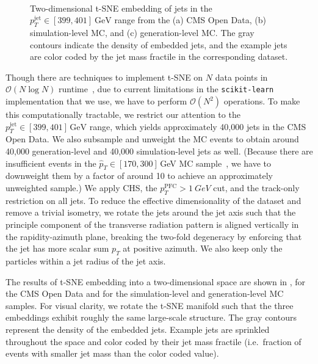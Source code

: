 \documentclass[aps,prd,twocolumn,preprintnumbers,nofootinbib,longbibliography,floatfix,superscriptaddress]{revtex4-1}
\begin{document}
\begin{figure*}
  \\
  \caption{
  Two-dimensional t-SNE embedding of jets in the $p_T^\text{jet}\in[399,401]~\text{GeV}$ range from the (a) CMS Open Data, (b) simulation-level MC, and (c) generation-level MC.
  The gray contours indicate the density of embedded jets, and the example jets are color coded by the jet mass fractile in the corresponding dataset.
  }
    \label{fig:tSNE}
\end{figure*}


Though there are techniques to implement t-SNE on $N$ data points in $\mathcal{O}(N \log N)$ runtime~\cite{DBLP:journals/jmlr/Maaten14}, due to current limitations in the {\tt scikit-learn}~\cite{scikit-learn} implementation that we use, we have to perform $\mathcal{O}(N^2)$ operations.
%
To make this computationally tractable, we restrict our attention to the $p_T^\text{jet}\in[399,401]\,\text{GeV}$ range, which yields approximately 40,000 jets in the CMS Open Data.
%
We also subsample and unweight the MC events to obtain around 40,000 generation-level and 40,000 simulation-level jets as well.
%
(Because there are insufficient events in the $\hat{p}_T \in [170,300]$\,GeV MC sample~\cite{CMS:QCDsim170-300}, we have to downweight them by a factor of around 10 to achieve an approximately unweighted sample.)
%
We apply CHS, the $p_T^\text{PFC} > \SI{1}{GeV}$ cut, and the track-only restriction on all jets.
%
To reduce the effective dimensionality of the dataset and remove a trivial isometry, we rotate the jets around the jet axis such that the principle component of the transverse radiation pattern is aligned vertically in the rapidity-azimuth plane, breaking the two-fold degeneracy by enforcing that the jet has more scalar sum $p_T$ at positive azimuth.
%
We also keep only the particles within a jet radius of the jet axis.


The results of t-SNE embedding into a two-dimensional space are shown in , for the CMS Open Data and for the simulation-level and generation-level MC samples.
%
For visual clarity, we rotate the t-SNE manifold such that the three embeddings exhibit roughly the same large-scale structure.
%
The gray contours represent the density of the embedded jets.
%
Example jets are sprinkled throughout the space and color coded by their jet mass fractile (i.e.~fraction of events with smaller jet mass than the color coded value).
\end{document}
